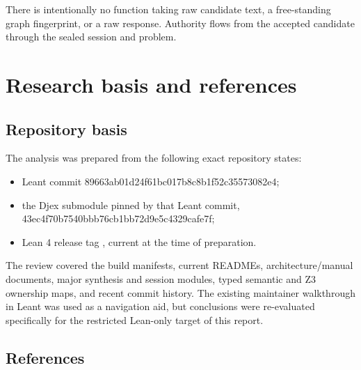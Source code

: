 \documentclass[10pt,letterpaper,oneside]{report}
\newcommand{\code}[1]{\texttt{\detokenize{#1}}}
\newcommand{\commitid}[1]{{\ttfamily\footnotesize #1}}
\begin{document}
There is intentionally no function taking raw candidate text, a free-standing graph fingerprint, or a raw \code{sat} response. Authority flows from the accepted candidate through the sealed session and problem.

\chapter{Research basis and references}\label{app:references}

\section{Repository basis}

The analysis was prepared from the following exact repository states:

\begin{itemize}
  \item Leant commit \commitid{89663ab01d24f61bc017b8c8b1f52c35573082e4};
  \item the Djex submodule pinned by that Leant commit, \commitid{43ec4f70b7540bbb76cb1bb72d9e5c4329cafe7f};
  \item Lean 4 release tag \code{v4.33.0}, current at the time of preparation.
\end{itemize}

The review covered the build manifests, current READMEs, architecture/manual documents, major synthesis and session modules, typed semantic and Z3 ownership maps, and recent commit history. The existing maintainer walkthrough in Leant was used as a navigation aid, but conclusions were re-evaluated specifically for the restricted Lean-only target of this report.

\section{References}
\end{document}
